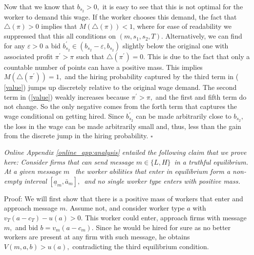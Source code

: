 \documentclass[12pt]{article}
\begin{document}
Now that we know that $b_{s_{2}}>0,$ it is easy to see that this is not
optimal for the worker to demand this wage. If the worker chooses this
demand, the fact that $\bigtriangleup (\pi )>0$ implies that $%
M(\bigtriangleup (\pi ))<1$, where for ease of readability we suppressed
that this all conditions on $(m,s_{1},s_{2},T).$ Alternatively, we can find
for any $\varepsilon >0$ a bid $b_{s_{2}}^{\prime }\in
(b_{s_{2}}-\varepsilon ,b_{s_{2}})$ slightly below the original one with
associated profit $\pi ^{\prime }>\pi $ such that $\bigtriangleup (\pi
^{\prime })=0.$ This is due to the fact that only a countable number of
points can have a positive mass. This implies $M(\bigtriangleup (\pi
^{\prime }))=1,$ and the hiring probability captured by the third term in (%
\ref{value}) jumps up discretely relative to the original wage demand$.$ The
second term in (\ref{value}) weakly increases because $\pi ^{\prime }>\pi ,$
and the first and fifth term do not change. So the only negative comes from
the forth term that captures the wage conditional on getting hired. Since $%
b_{s_{2}}^{\prime }$ can be made arbitrarily close to $b_{s_{2}},$ the loss
in the wage can be made arbitrarily small and, thus, less than the gain from
the discrete jump in the hiring probability. $\square $

\bigskip \bigskip

\noindent \textit{Online Appendix \ref{online_app:analysis} entailed the following claim that we
prove here: Consider firms that can send message }$m\in
\{L,H\}$\textit{\ in a truthful equilibrium. At a given message }$m$\textit{%
\ the worker abilities that enter in equilibrium form a non-empty interval }$%
[\underline{a}_{m},\bar{a}_{m}],$\textit{\ and no single worker type enters
with positive mass.}

Proof: We will first show that there is a positive mass of workers that
enter and approach message $m.$ Assume not, and consider worker type $a$
with $v_{T}(a-c_{T})-u\left( a\right) >0.$ This worker could enter, approach
firms with message $m,$ and bid $b=v_{m}(a-c_{m}).$ Since he would be hired
for sure as no better workers are present at any firm with such message, he
obtains $V(m,a,b)>u(a),$ contradicting the third equilibrium condition.
\end{document}
